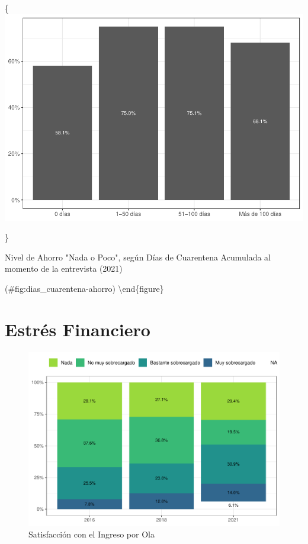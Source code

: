 \documentclass[
  12pt,
]{book}
\begin{document}
\{\centering \includegraphics{reporte-elsoc_files/figure-latex/dias_cuarentena-ahorro-1}

\}

\caption{Nivel de Ahorro "Nada o Poco", según Días de Cuarentena Acumulada al momento de la entrevista (2021)}

(\#fig:dias\_cuarentena-ahorro)
\textbackslash end\{figure\}

\hypertarget{estruxe9s-financiero}{%
\section{Estrés Financiero}\label{estruxe9s-financiero}}

\begin{figure}

{\centering \includegraphics{reporte-elsoc_files/figure-latex/satisfaccion-wave-1} 

}

\caption{Satisfacción con el Ingreso por Ola}\label{fig:satisfaccion-wave}
\end{figure}
\end{document}
